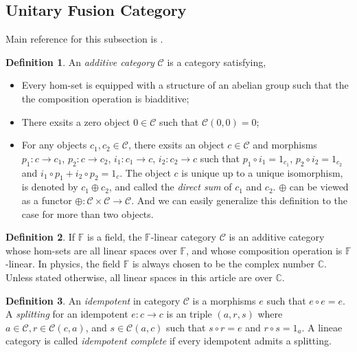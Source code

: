 \documentclass[a4paper,11pt]{article}
\theoremstyle{definition}
\newtheorem{definition}{Definition}[section]
\begin{document}
\subsection{Unitary Fusion Category}
Main reference for this subsection is \cite{etingof2015tensor}.
\begin{definition}
An \textit{additive category} $\mathcal{C}$  is a category satisfying,
\begin{itemize}
    \item Every hom-set is equipped with a structure of an abelian group such that the the composition operation is biadditive;
    \item There exsits a zero object $0\in \mathcal{C}$ such that $\mathcal{C}(0,0)=0$;
    \item For any objects $c_1,c_2\in \mathcal{C}$, there exsits an object $c\in \mathcal{C}$ and morphisms $p_1:c\to c_1$, $p_2:c\to c_2$, $i_1:c_1\to c$, $i_2:c_2\to c$ 
    such that $p_1\circ i_1=1_{c_1}$, $p_2\circ i_2=1_{c_2}$ and $i_1\circ p_1+i_2\circ p_2=1_c$. The object $c$ is unique up to a unique isomorphism, is denoted by $c_1\oplus c_2$, 
    and called the \textit{direct sum} of $c_1$ and $c_2$. $\oplus$ can be viewed as a functor $\oplus:\mathcal{C}\times \mathcal{C}\to \mathcal{C}$. 
    And we can easily generalize this definition to the case for more than two objects.
\end{itemize}
\end{definition}
\begin{definition}
    If $\mathbb{F}$ is a field, the $\mathbb{F}$-linear category $\mathcal{C}$  is an additive category whose hom-sets are all linear spaces over $\mathbb{F}$, 
    and whose composition operation is $\mathbb{F}$-linear. In physics, the field $\mathbb{F}$ is always chosen to be the complex number $\mathbb{C}$. 
    Unless stated otherwise, all linear spaces in this article are over $\mathbb{C}$. 
\end{definition}
\begin{definition}
    An \textit{idempotent} in category $\mathcal{C}$ is a morphisms $e$ such that $e\circ e=e$. A \textit{splitting} for an idempotent $e:c\to c$ is an triple $(a,r,s)$ 
    where $a\in \mathcal{C},r\in \mathcal{C}(c,a)$, and $s\in \mathcal{C}(a,c)$ such that $s\circ r=e$ and $r\circ s=1_a$. A lineae category is called \textit{idempotent complete} if 
    every idempotent admits a splitting.  
\end{definition}
\end{document}
